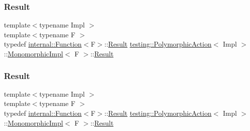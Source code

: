\mbox{\label{classtesting_1_1_polymorphic_action_1_1_monomorphic_impl_a7989da669c4c7a2da978ed78743815cb}} 
\subsubsection{\texorpdfstring{Result}{Result}\hspace{0.1cm}{\footnotesize\ttfamily [2/3]}}
{\footnotesize\ttfamily template$<$typename Impl $>$ \\
template$<$typename F $>$ \\
typedef \mbox{\hyperlink{structtesting_1_1internal_1_1_function}{internal\+::\+Function}}$<$F$>$\+::\mbox{\hyperlink{classtesting_1_1_action_interface_a7477de2fe3e4e01c59db698203acaee7}{Result}} \mbox{\hyperlink{classtesting_1_1_polymorphic_action}{testing\+::\+Polymorphic\+Action}}$<$ Impl $>$\+::\mbox{\hyperlink{classtesting_1_1_polymorphic_action_1_1_monomorphic_impl}{Monomorphic\+Impl}}$<$ F $>$\+::\mbox{\hyperlink{classtesting_1_1_action_interface_a7477de2fe3e4e01c59db698203acaee7}{Result}}}

\mbox{\label{classtesting_1_1_polymorphic_action_1_1_monomorphic_impl_a7989da669c4c7a2da978ed78743815cb}} 
\subsubsection{\texorpdfstring{Result}{Result}\hspace{0.1cm}{\footnotesize\ttfamily [3/3]}}
{\footnotesize\ttfamily template$<$typename Impl $>$ \\
template$<$typename F $>$ \\
typedef \mbox{\hyperlink{structtesting_1_1internal_1_1_function}{internal\+::\+Function}}$<$F$>$\+::\mbox{\hyperlink{classtesting_1_1_action_interface_a7477de2fe3e4e01c59db698203acaee7}{Result}} \mbox{\hyperlink{classtesting_1_1_polymorphic_action}{testing\+::\+Polymorphic\+Action}}$<$ Impl $>$\+::\mbox{\hyperlink{classtesting_1_1_polymorphic_action_1_1_monomorphic_impl}{Monomorphic\+Impl}}$<$ F $>$\+::\mbox{\hyperlink{classtesting_1_1_action_interface_a7477de2fe3e4e01c59db698203acaee7}{Result}}}



